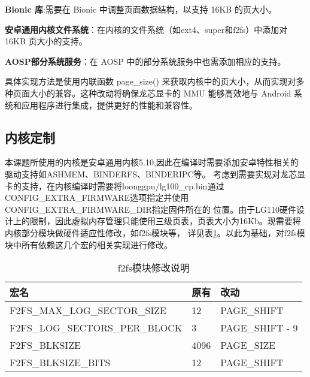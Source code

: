 \textbf{Bionic 库}:需要在 Bionic 中调整页面数据结构，以支持 16KB 的页大小。

\textbf{安卓通用内核文件系统}：在内核的文件系统（如ext4、super和f2fs）中添加对 16KB 页大小的支持。

\textbf{AOSP部分系统服务}：在 AOSP 中的部分系统服务中也需添加相应的支持。

具体实现方法是使用内联函数 page\_size() 来获取内核中的页大小，从而实现对多种页面大小的兼容。这种改动将确保龙芯显卡的 MMU 
能够高效地与 Android 系统和应用程序进行集成，提供更好的性能和兼容性。


\subsection{内核定制}
本课题所使用的内核是安卓通用内核5.10,因此在编译时需要添加安卓特性相关的驱动支持如ASHMEM、BINDERFS、BINDERIPC等。
考虑到需要实现对龙芯显卡的支持，在内核编译时需要将loonggpu/lg100\_cp.bin通过CONFIG\_EXTRA\_FIRMWARE选项指定并使用CONFIG\_EXTRA\_FIRMWARE\_DIR指定固件所在的
位置。由于LG110硬件设计上的限制，因此虚拟内存管理只能使用三级页表，页表大小为16Kb。现需要将内核部分模块做硬件适应性修改，如f2fs模块等，
详见表\ref{tab:f2fs模块修改说明}。以此为基础，对f2fs模块中所有依赖这几个宏的相关实现进行修改。

\begin{table}[h]
  \centering
  \caption{f2fs模块修改说明}
  \label{tab:f2fs模块修改说明}
  \begin{tabular}{lll}
    \toprule
    宏名   &   原有  &改动  \\
    \midrule
    F2FS\_MAX\_LOG\_SECTOR\_SIZE & 12 & PAGE\_SHIFT \\
    F2FS\_LOG\_SECTORS\_PER\_BLOCK & 3 & PAGE\_SHIFT - 9 \\
    F2FS\_BLKSIZE & 4096 & PAGE\_SIZE \\
    F2FS\_BLKSIZE\_BITS & 12 & PAGE\_SHIFT \\
    \bottomrule
  \end{tabular}
  \note{}
\end{table}


